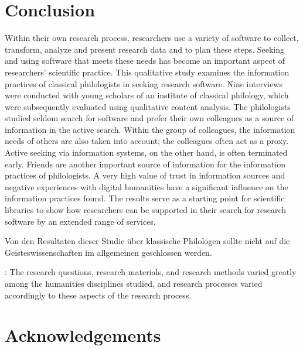 \documentclass[12pt, a4paper, titlepage, oneside, abstract=true, toc=listof, toc=bibliography, BCOR=1cm]{scrreprt}
\begin{document}
{\chapter{Conclusion}
\label{sec:conclusion}
Within their own research process, researchers use a variety of software to collect, transform, analyze and present research data and to plan these steps. Seeking and using software that meets these needs has become an important aspect of researchers' scientific practice. This qualitative study examines the information practices of classical philologists in seeking research software. Nine interviews were conducted with young scholars of an institute of classical philology, which were subsequently evaluated using qualitative content analysis. The philologists studied seldom search for software and prefer their own colleagues as a source of information in the active search. Within the group of colleagues, the information needs of others are also taken into account; the colleagues often act as a proxy. Active seeking via information systems, on the other hand, is often terminated early. Friends are another important source of information for the information practices of philologists. A very high value of trust in information sources and negative experiences with digital humanities have a significant influence on the information practices found. The results serve as a starting point for scientific libraries to show how researchers can be supported in their search for research software by an extended range of services.

Von den Resultaten dieser Studie über klassische Philologen sollte nicht auf die Geisteswissenschaften im allgemeinen geschlossen werden. 

\citep{Loennqvist2007}: The research questions, research materials, and research methods varied greatly among the humanities disciplines studied, and research processes varied accordingly to these aspects of the research process.


\chapter*{Acknowledgements}

}
\end{document}
